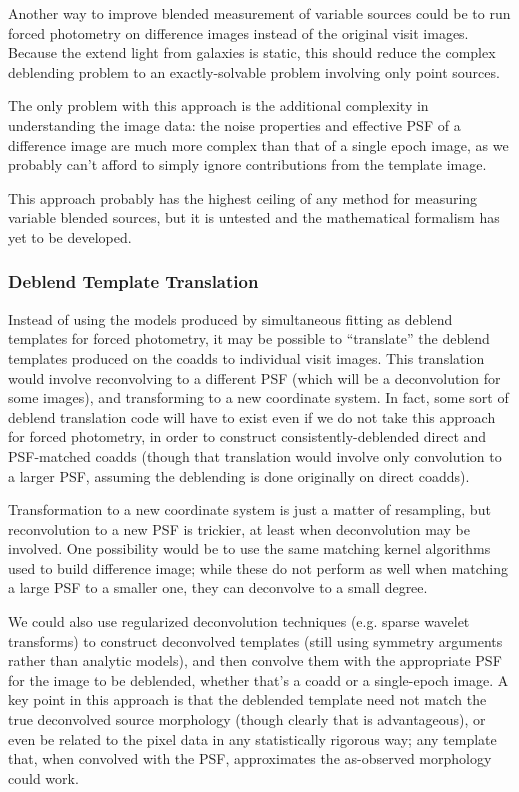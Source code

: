 \documentclass[10pt]{article}
\begin{document}
\label{sec:diffim-forced-phot}

Another way to improve blended measurement of variable sources could be to run
forced photometry on difference images instead of the original visit images.
Because the extend light from galaxies is static, this should reduce the
complex deblending problem to an exactly-solvable problem involving only
point sources.

The only problem with this approach is the additional complexity in
understanding the image data: the noise properties and effective PSF of a
difference image are much more complex than that of a single epoch image, as
we probably can't afford to simply ignore contributions from the template
image.

This approach probably has the highest ceiling of any method for measuring
variable blended sources, but it is untested and the mathematical formalism
has yet to be developed.

\subsubsection{Deblend Template Translation}

\label{sec:deblender-translation}

Instead of using the models produced by simultaneous fitting as deblend
templates for forced photometry, it may be possible to ``translate'' the
deblend templates produced on the coadds to individual visit images.  This
translation would involve reconvolving to a different PSF (which will be a
deconvolution for some images), and transforming to a new coordinate system.
In fact, some sort of deblend translation code will have to exist even if we
do not take this approach for forced photometry, in order to construct
consistently-deblended direct and PSF-matched coadds (though that translation
would involve only convolution to a larger PSF, assuming the deblending is
done originally on direct coadds).

Transformation to a new coordinate system is just a matter of resampling, but
reconvolution to a new PSF is trickier, at least when deconvolution may be
involved.  One possibility would be to use the same matching kernel algorithms
used to build difference image; while these do not perform as well when
matching a large PSF to a smaller one, they can deconvolve to a small degree.

We could also use regularized deconvolution techniques (e.g. sparse wavelet
transforms) to construct deconvolved templates (still using symmetry arguments
rather than analytic models), and then convolve them with the appropriate PSF
for the image to be deblended, whether that's a coadd or a single-epoch image.
A key point in this approach is that the deblended template need not match the
true deconvolved source morphology (though clearly that is advantageous), or
even be related to the pixel data in any statistically rigorous way; any
template that, when convolved with the PSF, approximates the as-observed
morphology could work.
\end{document}
